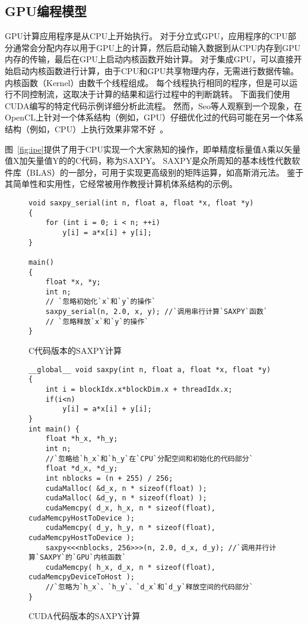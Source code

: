 

\subsection{GPU编程模型}

GPU计算应用程序是从CPU上开始执行。
对于分立式GPU，应用程序的CPU部分通常会分配内存以用于GPU上的计算，然后启动输入数据到从CPU内存到GPU内存的传输，最后在GPU上启动内核函数开始计算。
对于集成GPU，可以直接开始启动内核函数进行计算，由于CPU和GPU共享物理内存，无需进行数据传输。
内核函数（Kernel）由数千个线程组成。
每个线程执行相同的程序，但是可以运行不同控制流，这取决于计算的结果和运行过程中的判断跳转。
下面我们使用CUDA编写的特定代码示例详细分析此流程。
然而，Seo等人观察到一个现象，在OpenCL上针对一个体系结构（例如，GPU）仔细优化过的代码可能在另一个体系结构（例如，CPU）上执行效果非常不好~\cite{seo2011performance}。

图~\ref{fig:ipe}提供了用于CPU实现一个大家熟知的操作，即单精度标量值A乘以矢量值X加矢量值Y的的C代码，称为SAXPY。 
SAXPY是众所周知的基本线性代数软件库（BLAS）的一部分，可用于实现更高级别的矩阵运算，如高斯消元法。 
鉴于其简单性和实用性，它经常被用作教授计算机体系结构的示例。

\begin{figure}[htbp] 
  \centering
  \begin{lstlisting}[language={[ANSI]C}]
void saxpy_serial(int n, float a, float *x, float *y)
{
    for (int i = 0; i < n; ++i)
        y[i] = a*x[i] + y[i];
}

main() 
{
    float *x, *y;
    int n;
    // `忽略初始化`x`和`y`的操作`
    saxpy_serial(n, 2.0, x, y); //`调用串行计算`SAXPY`函数`
    // `忽略释放`x`和`y`的操作`
}
\end{lstlisting} 
\caption{C代码版本的SAXPY计算}
\label{fig:csaxpy}
\end{figure}


\begin{figure}[htbp]
\centering
\begin{lstlisting}[language={[ANSI]C}]
__global__ void saxpy(int n, float a, float *x, float *y)
{
    int i = blockIdx.x*blockDim.x + threadIdx.x;
    if(i<n)
        y[i] = a*x[i] + y[i];
}
int main() {
    float *h_x, *h_y;
    int n;
    //`忽略给`h_x`和`h_y`在`CPU`分配空间和初始化的代码部分`
    float *d_x, *d_y;
    int nblocks = (n + 255) / 256;
    cudaMalloc( &d_x, n * sizeof(float) );
    cudaMalloc( &d_y, n * sizeof(float) );
    cudaMemcpy( d_x, h_x, n * sizeof(float), cudaMemcpyHostToDevice );
    cudaMemcpy( d_y, h_y, n * sizeof(float), cudaMemcpyHostToDevice );
    saxpy<<<nblocks, 256>>>(n, 2.0, d_x, d_y); //`调用并行计算`SAXPY`的`GPU`内核函数`
    cudaMemcpy( h_x, d_x, n * sizeof(float), cudaMemcpyDeviceToHost );
    //`忽略为`h_x`、`h_y`、`d_x`和`d_y`释放空间的代码部分`
}
\end{lstlisting} 
\caption{CUDA代码版本的SAXPY计算}
\label{fig:cudasaxpy}
\end{figure}



